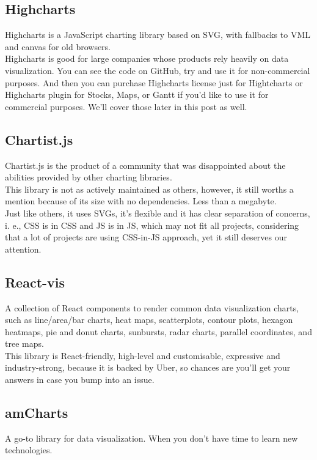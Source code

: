 \subsection{Highcharts}
Highcharts is a JavaScript charting library based on SVG, with fallbacks to VML and canvas for old browsers.\\

Highcharts is good for large companies whose products rely heavily on data visualization. You can see the code on GitHub, try and use it for non-commercial purposes. And then you can purchase Highcharts license just for Hightcharts or Highcharts plugin for Stocks, Maps, or Gantt if you'd like to use it for commercial purposes. We'll cover those later in this post as well.
\subsection{Chartist.js}
Chartist.js is the product of a community that was disappointed about the abilities provided by other charting libraries.\\

This library is not as actively maintained as others, however, it still worths a mention because of its size with no dependencies. Less than a megabyte.\\

Just like others, it uses SVGs, it's flexible and it has clear separation of concerns, i. e., CSS is in CSS and JS is in JS, which may not fit all projects, considering that a lot of projects are using CSS-in-JS approach, yet it still deserves our attention.
\subsection{React-vis}
A collection of React components to render common data visualization charts, such as line/area/bar charts, heat maps, scatterplots, contour plots, hexagon heatmaps, pie and donut charts, sunbursts, radar charts, parallel coordinates, and tree maps.\\

This library is React-friendly, high-level and customisable, expressive and industry-strong, because it is backed by Uber, so chances are you'll get your answers in case you bump into an issue.
\newpage
\subsection{amCharts}
A go-to library for data visualization. When you don't have time to learn new technologies.\\

